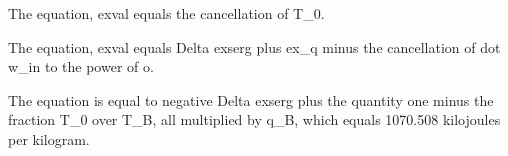 The equation, exval equals the cancellation of T_0.

The equation, exval equals Delta exserg plus ex_q minus the cancellation of dot w_in to the power of o.

The equation is equal to negative Delta exserg plus the quantity one minus the fraction T_0 over T_B, all multiplied by q_B, which equals 1070.508 kilojoules per kilogram.